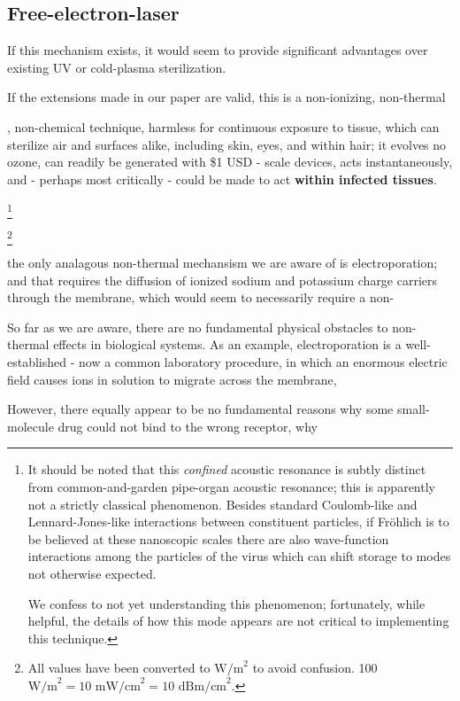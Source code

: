 \documentclass[paper.tex]{subfiles}
\begin{document}
\begin{multicols}{1}
\subsection{Free-electron-laser }


If this mechanism exists, it would seem to provide significant advantages over existing UV or cold-plasma sterilization. 

If the extensions made in our paper are valid, this is a non-ionizing, non-thermal

, non-chemical technique, harmless for continuous exposure to tissue, which can sterilize air and surfaces alike, including skin, eyes, and within hair; it evolves no ozone, can readily be generated with \$1 USD - scale devices, acts instantaneously, and - perhaps most critically - could be made to act {\bf within infected tissues}.




\footnote{It should be noted that this {\it confined} acoustic resonance is subtly distinct from common-and-garden pipe-organ acoustic resonance; this is apparently not a strictly classical phenomenon. Besides standard Coulomb-like and Lennard-Jones-like interactions between constituent particles, if Fr\"{o}hlich is to be believed at these nanoscopic scales there are also wave-function interactions among the particles of the virus which can shift storage to modes not otherwise expected.
	
	We confess to not yet understanding this phenomenon; fortunately, while helpful, the details of how this mode appears are not critical to implementing this technique.}


\footnote{All values have been converted to $\text{W/m}^2$ to avoid confusion. 100 $\text{W/m}^2 = 10 \text{ mW/cm}^2 = 10 \text{ dBm/cm}^2$.}




the only analagous non-thermal mechansism we are aware of is electroporation; and that requires the diffusion of ionized sodium and potassium charge carriers through the membrane, which would seem to necessarily require a non-



So far as we are aware, there are no fundamental physical obstacles to non-thermal effects in biological systems. As an example, electroporation is a well-established - now a common laboratory procedure, in which an enormous electric field causes ions in solution to migrate across the membrane, 

However, there equally appear to be no fundamental reasons why some small-molecule drug could not bind to the wrong receptor, why 




\end{multicols}
\end{document}
